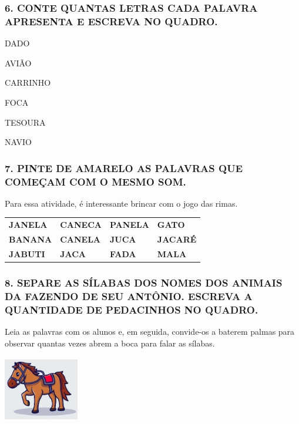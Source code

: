 \subsubsection{6. CONTE QUANTAS LETRAS CADA PALAVRA APRESENTA E ESCREVA NO
QUADRO.}\label{conte-quantas-letras-tem-as-palavras-e-escreva-no-quadro.}

DADO

AVIÃO

CARRINHO

FOCA

TESOURA

NAVIO

\subsubsection{7. PINTE DE AMARELO AS PALAVRAS QUE COMEÇAM COM
O MESMO
SOM.}\label{pinte-de-amarelo-as-palavras-no-quadro-que-comeuxe7a-com-o-mesmo-som.}

Para essa atividade, é interessante brincar com o jogo das rimas.

\begin{longtable}[]{@{}llll@{}}
\toprule
\textbf{JANELA} & \textbf{CANECA} & \textbf{PANELA} &
\textbf{GATO}\tabularnewline
\textbf{BANANA} & \textbf{CANELA} & \textbf{JUCA} &
\textbf{JACARÉ}\tabularnewline
\textbf{JABUTI} & \textbf{JACA} & \textbf{FADA} &
\textbf{MALA}\tabularnewline
\bottomrule
\end{longtable}

\subsubsection{8. SEPARE AS SÍLABAS DOS NOMES DOS ANIMAIS
DA FAZENDO DE SEU ANTÔNIO. ESCREVA A QUANTIDADE DE PEDACINHOS NO
QUADRO.}\label{separe-as-suxedlabas-das-palavras-dos-nomes-dos-animais-da-fazendo-de-seu-antuxf4nio.-e-escreva-a-quantidade-de-pedacinho-no-quadro.}

Leia as palavras com os alunos e, em seguida, convide-os a baterem
palmas para observar quantas vezes abrem a boca para falar as sílabas.


\includegraphics[width=1.29126in,height=1.13542in]{media/image26.jpg}

